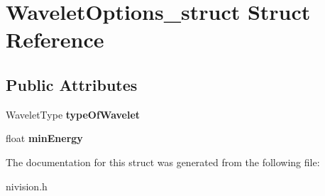 \hypertarget{structWaveletOptions__struct}{
\section{WaveletOptions\_\-struct Struct Reference}
\label{structWaveletOptions__struct}
}
\subsection*{Public Attributes}
\begin{DoxyCompactItemize}
\item 
\hypertarget{structWaveletOptions__struct_a8ec9102c943dceaf647ecac303dd7000}{
WaveletType {\bfseries typeOfWavelet}}
\label{structWaveletOptions__struct_a8ec9102c943dceaf647ecac303dd7000}

\item 
\hypertarget{structWaveletOptions__struct_a184dcbcefe40126e58a24b014adf8cbe}{
float {\bfseries minEnergy}}
\label{structWaveletOptions__struct_a184dcbcefe40126e58a24b014adf8cbe}

\end{DoxyCompactItemize}


The documentation for this struct was generated from the following file:\begin{DoxyCompactItemize}
\item 
nivision.h\end{DoxyCompactItemize}
